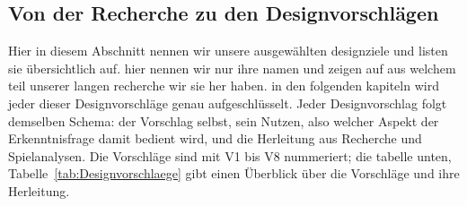 \documentclass[../Main.tex]{subfiles}
\begin{document}
\subsection{Von der Recherche zu den Designvorschlägen} \label{sec:Designvorschlaege}

Hier in diesem Abschnitt nennen wir unsere ausgewählten designziele und listen sie übersichtlich auf. hier nennen wir nur ihre namen und zeigen auf aus welchem teil unserer langen recherche wir sie her haben. in den folgenden kapiteln wird jeder dieser Designvorschläge genau aufgeschlüsselt. Jeder Designvorschlag folgt demselben Schema: der Vorschlag selbst, sein Nutzen, also welcher Aspekt der Erkenntnisfrage damit bedient wird, und die Herleitung aus Recherche und Spielanalysen. Die Vorschläge sind mit V1 bis V8 nummeriert; die tabelle unten, Tabelle~\ref{tab:Designvorschlaege} gibt einen Überblick über die Vorschläge und ihre Herleitung.
\end{document}
